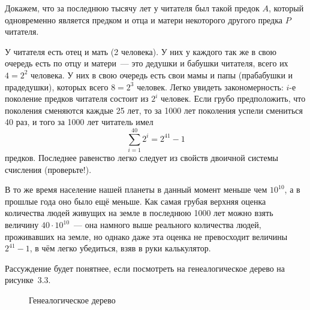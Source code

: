 \begin{example}
Докажем, что за последнюю тысячу лет у читателя был такой предок $A$, который одновременно является предком и отца и матери некоторого другого предка $P$ читателя.

У читателя есть отец и мать (2 человека). У них у каждого так же в свою очередь есть по отцу и матери~--- это дедушки и бабушки читателя, всего их $4=2^2$ человека. У них в свою очередь есть свои мамы и папы (прабабушки и прадедушки), которых всего $8=2^3$ человек. Легко увидеть закономерность: $i$-е поколение предков читателя состоит из $2^i$ человек. Если грубо предположить, что поколения сменяются каждые 25 лет, то за 1000 лет поколения успели смениться 40 раз, и того за 1000 лет читатель имел
$$\sum_{i=1}^{40} 2^i = 2^{41} - 1$$
предков. Последнее равенство легко следует из свойств двоичной системы счисления (проверьте!).

В то же время население нашей планеты в данный момент меньше чем $10^{10}$, а в прошлые года оно было ещё меньше. Как самая грубая верхняя оценка количества людей живущих на земле в последнюю 1000 лет можно взять величину $40\cdot 10^10$~--- она намного выше реального количества людей, проживавших на земле, но однако даже эта оценка не превосходит величины $2^{41} - 1$, в чём легко убедиться, взяв в руки калькулятор.

Рассуждение будет понятнее, если посмотреть на генеалогическое дерево на рисунке~3.3.

\begin{figure}[h]
\centering
{}
\caption{Генеалогическое дерево}
\end{figure}


\end{example}
